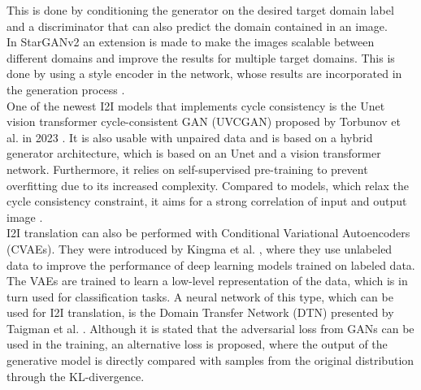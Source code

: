 This is done by conditioning the generator on the desired target domain label and a discriminator that can also predict the domain contained in an image.\\
In StarGANv2 an extension is made to make the images scalable between different domains and improve the results for multiple target domains.
This is done by using a style encoder in the network, whose results are incorporated in the generation process \cite*{choi2020stargan}.\\
One of the newest I2I models that implements cycle consistency is the Unet vision transformer cycle-consistent GAN (UVCGAN) proposed by Torbunov et al. in 2023 \cite{torbunov2023uvcgan}.
It is also usable with unpaired data and is based on a hybrid generator architecture, which is based on an Unet and a vision transformer network.
Furthermore, it relies on self-supervised pre-training to prevent overfitting due to its increased complexity.
Compared to models, which relax the cycle consistency constraint, it aims for a strong correlation of input and output image \cite{torbunov2023uvcgan}.\\
I2I translation can also be performed with Conditional Variational Autoencoders (CVAEs).
They were introduced by Kingma et al. \cite{kingma2014semi}, where they use unlabeled data to improve the performance of deep learning models trained on labeled data.
The VAEs are trained to learn a low-level representation of the data, which is in turn used for classification tasks.
A neural network of this type, which can be used for I2I translation, is the Domain Transfer Network (DTN) presented by Taigman et al. \cite{taigman2016unsupervised}.
Although it is stated that the adversarial loss from GANs can be used in the training, an alternative loss is proposed, where the output of the generative model is directly compared with samples from the original distribution through the KL-divergence.

